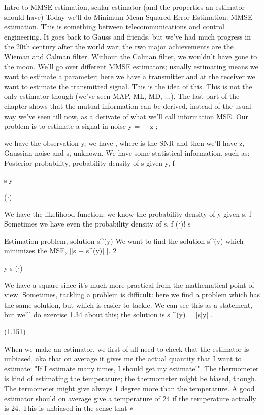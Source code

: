 {Intro to MMSE estimation, scalar estimator (and the properties an estimator should have)
Today we'll do Minimum Mean Squared Error Estimation: MMSE estimation.
This is something between telecommunications and control engineering.
It goes back to Gauss and friends, but we've had much progress in the 20th century after the world war; the two major achievements are the Wieman and Calman filter.
Without the Calman filter, we wouldn't have gone to the moon.
We'll go over different MMSE estimators; usually estimating means we want to estimate a parameter; here we have a transmitter and at the receiver we want to estimate the transmitted signal. This is the idea of this.
This is not the only estimator though (we've seen MAP, ML, MD, ...).
The last part of the chapter shows that the mutual information can be derived, instead of the usual way we've seen till now, as a derivate of what we'll call information MSE.
Our problem is to estimate a signal in noise y = \sqrt{\rhos} + z ;

we have the observation y, we have \sqrt{\rho}, where \rho is the SNR and then we'll have z,
Gaussian noise and s, unknown.
We have some statistical information, such as:
Posterior probability, probability density of s given y, f

s|y

(⋅)

We have the likelihood function: we know the probability density of y given s, f Sometimes we have even the probability density of s, f (⋅)!
s

​Estimation problem, solution s^(y)
We want to find the solution s^(y) which minimizes the MSE, [|s − s^(y)| ].
2

y|s (⋅)

We have a square since it's much more practical from the mathematical point of view.
Sometimes, tackling a problem is difficult: here we find a problem which has the same solution, but which is easier to tackle.
We can see this as a statement, but we'll do exercise 1.34 about this; the solution is s
^(y) = [s|y] .

(1.151)

When we make an estimator, we first of all need to check that the estimator is unbiased, aka that on average it gives me the actual quantity that I want to estimate:
"If I estimate many times, I should get my estimate!".
The thermometer is kind of estimating the temperature; the thermometer might be biased, though. The termometer might give always 1 degree more than the temperature.
A good estimator should on average give a temperature of 24 if the temperature actually is 24.
This is unbiased in the sense that
∗

}
